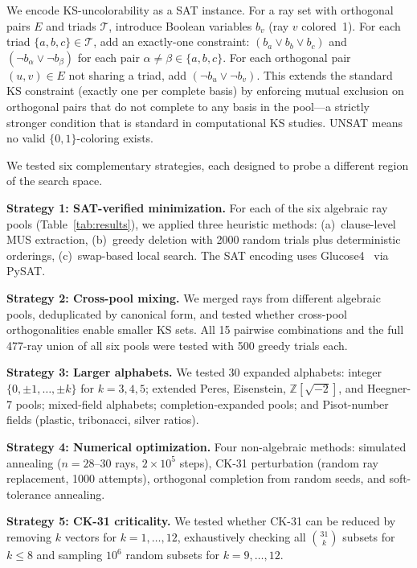 \documentclass[twocolumn,prl,superscriptaddress,nofootinbib]{revtex4-2}
\newcommand{\Z}{\mathbb{Z}}
\begin{document}
We encode KS-uncolorability as a SAT instance.  For a ray set with orthogonal pairs $E$ and triads $\mathcal{T}$, introduce Boolean variables $b_v$ (ray $v$ colored~1).  For each triad $\{a,b,c\} \in \mathcal{T}$, add an exactly-one constraint: $(b_a \vee b_b \vee b_c)$ and $(\neg b_\alpha \vee \neg b_\beta)$ for each pair $\alpha \neq \beta \in \{a,b,c\}$.  For each orthogonal pair $(u,v) \in E$ not sharing a triad, add $(\neg b_u \vee \neg b_v)$.  This extends the standard KS constraint (exactly one per complete basis) by enforcing mutual exclusion on orthogonal pairs that do not complete to any basis in the pool---a strictly stronger condition that is standard in computational KS studies.  UNSAT means no valid $\{0,1\}$-coloring exists.

We tested six complementary strategies, each designed to probe a different region of the search space.

\textbf{Strategy 1: SAT-verified minimization.} For each of the six algebraic ray pools (Table~\ref{tab:results}), we applied three heuristic methods: (a)~clause-level MUS extraction, (b)~greedy deletion with 2000 random trials plus deterministic orderings, (c)~swap-based local search. The SAT encoding uses Glucose4~\cite{AudemardSimon2018} via PySAT.

\textbf{Strategy 2: Cross-pool mixing.} We merged rays from different algebraic pools, deduplicated by canonical form, and tested whether cross-pool orthogonalities enable smaller KS sets. All 15 pairwise combinations and the full 477-ray union of all six pools were tested with 500 greedy trials each.

\textbf{Strategy 3: Larger alphabets.} We tested 30 expanded alphabets: integer $\{0,\pm1,\ldots,\pm k\}$ for $k = 3, 4, 5$; extended Peres, Eisenstein, $\Z[\sqrt{-2}]$, and Heegner-7 pools; mixed-field alphabets; completion-expanded pools; and Pisot-number fields (plastic, tribonacci, silver ratios).

\textbf{Strategy 4: Numerical optimization.} Four non-algebraic methods: simulated annealing ($n = 28$--$30$ rays, $2 \times 10^5$ steps), CK-31 perturbation (random ray replacement, 1000 attempts), orthogonal completion from random seeds, and soft-tolerance annealing.

\textbf{Strategy 5: CK-31 criticality.} We tested whether CK-31 can be reduced by removing $k$ vectors for $k = 1, \ldots, 12$, exhaustively checking all $\binom{31}{k}$ subsets for $k \leq 8$ and sampling $10^6$ random subsets for $k = 9, \ldots, 12$.
\end{document}
